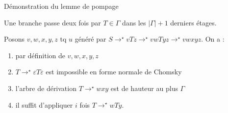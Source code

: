 \begin{frame}{Démonstration du lemme de pompage}
{    Une branche passe deux fois par $T \in \Gamma$ dans les $|\Gamma| + 1$ derniers étages.

    \alert{Posons $v, w, x, y, z$} tq $u$ généré par $S \rightarrow^\star v T z \rightarrow^\star v w T y z \rightarrow^\star v w x y z$. On a :

    \vspace{1mm}
    \begin{enumerate}
    \item {} par définition de $v, w, x, y, z$
    \item {} $T \rightarrow^\star \varepsilon T \varepsilon$ est impossible en forme normale de Chomsky
    \item {} l'arbre de dérivation $T \rightarrow^\star w x y$ est de hauteur au plus $\Gamma$
    \item {} il suffit d'appliquer $i$ fois $T \rightarrow^\star w T y$.
    \end{enumerate}
  }
  
\end{frame}

\endgroup
